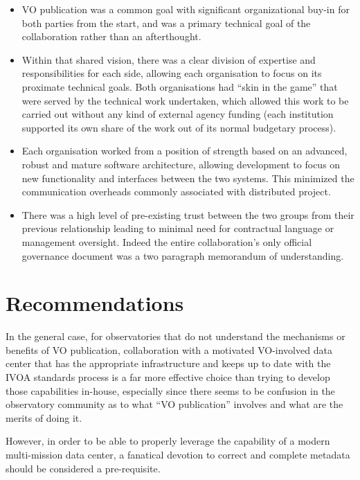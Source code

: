 \documentclass[final,authoryear,5p,times,twocolumn]{elsarticle}
\begin{document}
\begin{itemize}
\item VO publication was a common goal with significant organizational
  buy-in for both parties from the start, and was a primary technical
  goal of the collaboration rather than an afterthought.

\item Within that shared vision, there was a clear division of
  expertise and responsibilities for each side, allowing each
  organisation to focus on its proximate technical goals. Both
  organisations had ``skin in the game'' that were served by the
  technical work undertaken, which allowed this work to be carried out
  without any kind of external agency funding (each institution
  supported its own share of the work out of its normal budgetary
  process).

\item Each organisation worked from a position of strength based on an
  advanced, robust and mature software architecture, allowing
  development to focus on new functionality and interfaces between the
  two systems. This minimized the communication overheads commonly
  associated with distributed project.

\item There was a high level of pre-existing trust between the two
  groups from their previous relationship leading to minimal need for
  contractual language or management oversight. Indeed the entire
  collaboration's only official governance document was a two paragraph
  memorandum of understanding.
\end{itemize}

\section{Recommendations}

In the general case, for observatories that do not understand the
mechanisms or benefits of VO publication, collaboration with a
motivated VO-involved data center that has the appropriate
infrastructure and keeps up to date with the IVOA standards process is
a far more effective choice than trying to develop those capabilities
in-house, especially since there seems to be confusion in the
observatory community as to what ``VO publication'' involves and what
are the merits of doing it.

However, in order to be able to properly leverage the capability of a
modern multi-mission data center, a fanatical devotion to correct and
complete metadata should be considered a pre-requisite.
\end{document}
